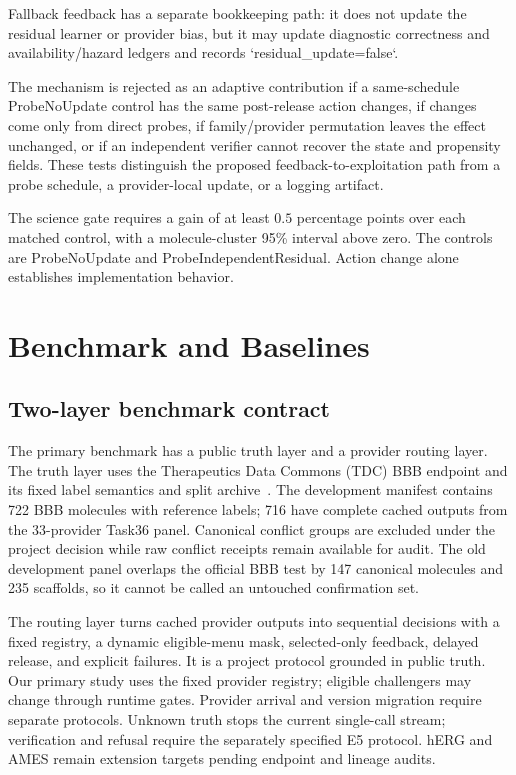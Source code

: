 \documentclass[sigconf,anonymous]{aamas}
\begin{document}
Fallback feedback has a separate bookkeeping path: it does not update the residual learner or provider bias, but it may update diagnostic correctness and availability/hazard ledgers and records `residual\_update=false`.

The mechanism is rejected as an adaptive contribution if a same-schedule ProbeNoUpdate control has the same post-release action changes, if changes come only from direct probes, if family/provider permutation leaves the effect unchanged, or if an independent verifier cannot recover the state and propensity fields. These tests distinguish the proposed feedback-to-exploitation path from a probe schedule, a provider-local update, or a logging artifact.

The science gate requires a gain of at least $0.5$ percentage points over each matched control, with a molecule-cluster 95\% interval above zero. The controls are ProbeNoUpdate and ProbeIndependentResidual. Action change alone establishes implementation behavior.

\section{Benchmark and Baselines}
\subsection{Two-layer benchmark contract}
The primary benchmark has a public truth layer and a provider routing layer. The truth layer uses the Therapeutics Data Commons (TDC) BBB endpoint and its fixed label semantics and split archive~\cite{huang2021tdc}. The development manifest contains 722 BBB molecules with reference labels; 716 have complete cached outputs from the 33-provider Task36 panel. Canonical conflict groups are excluded under the project decision while raw conflict receipts remain available for audit. The old development panel overlaps the official BBB test by 147 canonical molecules and 235 scaffolds, so it cannot be called an untouched confirmation set.

The routing layer turns cached provider outputs into sequential decisions with a fixed registry, a dynamic eligible-menu mask, selected-only feedback, delayed release, and explicit failures. It is a project protocol grounded in public truth. Our primary study uses the fixed provider registry; eligible challengers may change through runtime gates. Provider arrival and version migration require separate protocols. Unknown truth stops the current single-call stream; verification and refusal require the separately specified E5 protocol. hERG and AMES remain extension targets pending endpoint and lineage audits.
\end{document}
